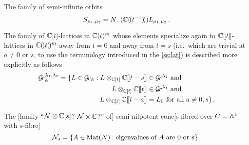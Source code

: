 \documentclass{article}
\begin{document}
The family of semi-infinite orbits 
\begin{equation}
    S_{\mu_1,\mu_2} = N_-(\CC\xT[t^{-1}]) L_{\mu_1,\mu_2}\,. 
\end{equation}

The family  of $\CC[t]$-lattices in $\CC(t)^m$ whose elements specialize again to $\CC\xt$-lattices in $\CC\xT^m$ away from $t = 0$ and away from $t = s$ (i.e.\ which are trivial at $a \ne 0$ or $s$, to use the terminology introduced in the \cref{ss:lat}) is described more explicitly as follows
\begin{equation}
    \label{eq:defGrBDlambda}
    \begin{split}
        \Gr_{\AA}^{\lambda_1,\lambda_2} = 
        \{L \in\Grbd : 
        L \otimes_{\CC[t]} \CC\xt[t-s] 
        &\in \Gr^{\lambda_2} \text{ and } \\
        L\otimes_{\CC[t]} \CC\xt &\in \Gr^{\lambda_1} \text{ and } \\ 
        L \otimes_{\CC[t]} \CC\xt[t-a] &= L_0 \text{ for all $ a \ne 0, s$} \}\,.
    \end{split}
\end{equation}

% 

The [family ``$\cN\otimes\CC[s]$? $\cN\times\CC$?'' of] semi-nilpotent cone[s fibred over $C = \AA^1$ with $s$-fibre] 
\begin{equation}
    \cN_s = \{A \in \mat(N) : \text{eigenvalues of } A \text{ are } 0 \text{ or }s\}\,.
\end{equation}
\end{document}
